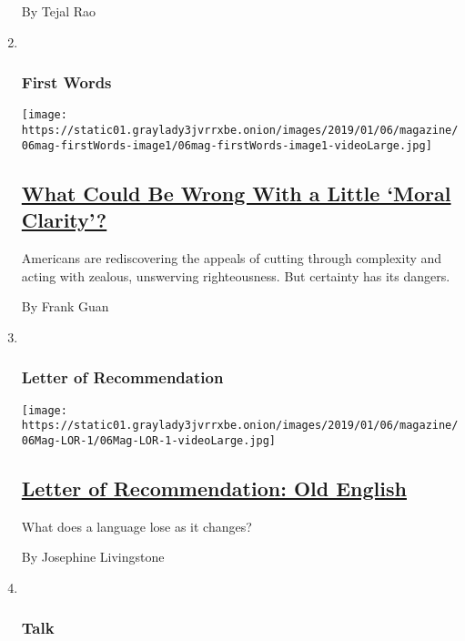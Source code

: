 \begin{enumerate}
  By Tejal Rao
\item ~
  \hypertarget{first-words}{%
  \subsubsection{First Words}\label{first-words}}

  \texttt{[image: https://static01.graylady3jvrrxbe.onion/images/2019/01/06/magazine/06mag-firstWords-image1/06mag-firstWords-image1-videoLarge.jpg]}

  \hypertarget{what-could-be-wrong-with-a-little-moral-clarity}{%
  \subsection{\texorpdfstring{\href{/2019/01/02/magazine/what-could-be-wrong-with-a-little-moral-clarity.html}{What
  Could Be Wrong With a Little `Moral
  Clarity'?}}{What Could Be Wrong With a Little `Moral Clarity'?}}\label{what-could-be-wrong-with-a-little-moral-clarity}}

  Americans are rediscovering the appeals of cutting through complexity
  and acting with zealous, unswerving righteousness. But certainty has
  its dangers.

  By Frank Guan
\item ~
  \hypertarget{letter-of-recommendation}{%
  \subsubsection{Letter of
  Recommendation}\label{letter-of-recommendation}}

  \texttt{[image: https://static01.graylady3jvrrxbe.onion/images/2019/01/06/magazine/06Mag-LOR-1/06Mag-LOR-1-videoLarge.jpg]}

  \hypertarget{letter-of-recommendation-old-english}{%
  \subsection{\texorpdfstring{\href{/2019/01/04/magazine/letter-of-recommendation-old-english.html}{Letter
  of Recommendation: Old
  English}}{Letter of Recommendation: Old English}}\label{letter-of-recommendation-old-english}}

  What does a language lose as it changes?

  By Josephine Livingstone
\item ~
  \hypertarget{talk}{%
  \subsubsection{Talk}\label{talk}}


\end{enumerate}
